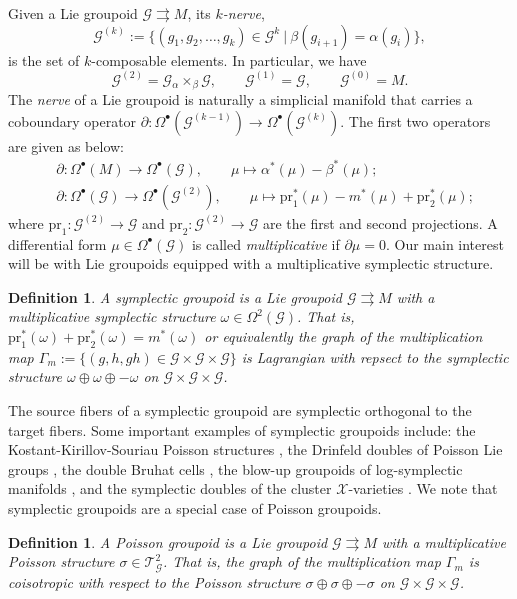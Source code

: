 \documentclass{amsart}
\newtheorem{definition}[theorem]{Definition}
\numberwithin{equation}{section}
\newcommand{\cG}{\mathcal{G}}
\newcommand{\cT}{\mathcal{T}}
\newcommand{\cX}{\mathcal{X}}
\newcommand{\rra}{\rightrightarrows}
\begin{document}
Given a Lie groupoid $\cG \rra M$, its \emph{$k$-nerve},
\[\cG^{(k)} := \{(g_1, g_2, \ldots, g_k) \in \cG^k ~|~ \beta(g_{i+1}) = \alpha(g_i)\},\]
is the set of $k$-composable elements.
In particular, we have
\[\cG^{(2)} = \cG {_\alpha \times_\beta} \cG,\qquad \cG^{(1)} = \cG,\qquad \cG^{(0)} = M.\]
The \emph{nerve} of a Lie groupoid is naturally a simplicial manifold that carries a coboundary operator $\partial: \Omega^\bullet(\cG^{(k-1)}) \to \Omega^\bullet(\cG^{(k)})$.
The first two operators are given as below:
\begin{align} 
  \label{eq:gpdcob}
  & \partial: \Omega^\bullet(M) \to \Omega^\bullet(\cG), \qquad \mu \mapsto \alpha^*(\mu) - \beta^*(\mu); \\
  & \partial: \Omega^\bullet(\cG) \to \Omega^\bullet(\cG^{(2)}), \qquad \mu \mapsto \mathrm{pr}_1^*(\mu) - m^*(\mu) + \mathrm{pr}_2^*(\mu);
\end{align}
where $\mathrm{pr}_1: \cG^{(2)} \to \cG$ and $\mathrm{pr}_2: \cG^{(2)} \to \cG$ are the first and second projections.
A differential form $\mu \in \Omega^\bullet(\cG)$ is called \emph{multiplicative} if $\partial \mu = 0$.
Our main interest will be with Lie groupoids equipped with a multiplicative symplectic structure.
\begin{definition}
  A \emph{symplectic groupoid} is a Lie groupoid $\cG \rra M$ with a multiplicative symplectic structure $\omega \in \Omega^2(\cG)$.
  That is, $\mathrm{pr}_1^*(\omega)+\mathrm{pr}_2^*(\omega) = m^*(\omega)$ or equivalently the graph of the multiplication map $\Gamma_m := \{(g, h, gh) \in \cG \times \cG \times \cG\}$ is Lagrangian with repsect to the symplectic structure $\omega \oplus \omega \oplus -\omega$ on $\cG\times\cG\times\cG$.
\end{definition}

The source fibers of a symplectic groupoid are symplectic orthogonal to the target fibers.
Some important examples of symplectic groupoids include: the Kostant-Kirillov-Souriau Poisson structures \cite{CDW87}, the Drinfeld doubles of Poisson Lie groups \cite{LW89}, the double Bruhat cells \cite{LuM16}, the blow-up groupoids of log-symplectic manifolds \cite{GL14}, and the symplectic doubles of the cluster $\cX$-varieties \cite{FG09c}.
We note that symplectic groupoids are a special case of Poisson groupoids.
\begin{definition}
  A \emph{Poisson groupoid} is a Lie groupoid $\cG \rra M$ with a multiplicative Poisson structure $\sigma \in \cT^2_\cG$.
  That is, the graph of the multiplication map $\Gamma_m$ is coisotropic with respect to the Poisson structure $\sigma \oplus \sigma \oplus -\sigma$ on $\cG\times\cG\times\cG$.
\end{definition}
\end{document}
